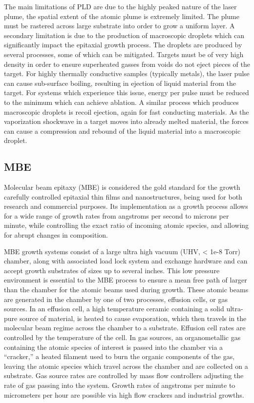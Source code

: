 The main limitations of PLD are due to the highly peaked nature of the laser plume, the spatial extent of the atomic plume is extremely limited.
The plume must be rastered across large substrate into order to grow a uniform layer.
A secondary limitation is due to the production of macroscopic droplets which can significantly impact the epitaxial growth process.
The droplets are produced by several processes, some of which can be mitigated.
Targets must be of very high density in order to ensure superheated gasses from voids do not eject pieces of the target.
For highly thermally conductive samples (typically metals), the laser pulse can cause sub-surface boiling, resulting in ejection of liquid material from the target.
For systems which experience this issue, energy per pulse must be reduced to the minimum which can achieve ablation.
A similar process which produces macroscopic droplets is recoil ejection, again for fast conducting materials.
As the vaporization shockwave in a target moves into already melted material, the forces can cause a compression and rebound of the liquid material into a macroscopic droplet.

\subsection{MBE} Molecular beam epitaxy (MBE) is considered the gold standard for the growth carefully controlled epitaxial thin films and nanostructures, being used for both research and commercial purposes.
Its implementation as a growth process allows for a wide range of growth rates from angstroms per second to microns per minute, while controlling the exact ratio of incoming atomic species, and allowing for abrupt changes in composition.

MBE growth systems consist of a large ultra high vacuum (UHV, < 1e-8 Torr) chamber, along with associated load lock system and exchange hardware and can accept growth substrates of sizes up to several inches.
This low pressure environment is essential to the MBE process to ensure a mean free path of larger than the chamber for the atomic beams used during growth.
These atomic beams are generated in the chamber by one of two processes, effusion cells, or gas sources.
In an effusion cell, a high temperature ceramic containing a solid ultra-pure source of material, is heated to cause evaporation, which then travels in the molecular beam regime across the chamber to a substrate.
Effusion cell rates are controlled by the temperature of the cell.
In gas sources, an organometallic gas containing the atomic species of interest is passed into the chamber via a ``cracker,'' a heated filament used to burn the organic components of the gas, leaving the atomic species which travel across the chamber and are collected on a substrate.
Gas source rates are controlled by mass flow controllers adjusting the rate of gas passing into the system.
Growth rates of angstroms per minute to micrometers per hour are possible via high flow crackers and industrial growths.

